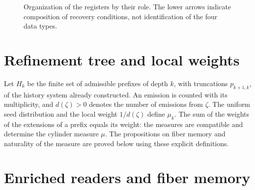 \begin{figure}[htbp]
\centering
{}
\caption{Organization of the registers by their role.
The lower arrows indicate composition of recovery
conditions, not identification of the four data types.}
\label{x_reciprocidad:lib07:fig-registros}
\end{figure}

\section{Refinement tree and local weights}
Let \(H_k\) be the finite set of admissible prefixes of depth
\(k\), with truncations \(p_{k+1,k}\), of the history system already
constructed. An emission is counted with its multiplicity, and
\(d(\zeta)>0\) denotes the number of emissions from \(\zeta\).
The uniform seed distribution and the local weight
\(1/d(\zeta)\) define \(\mu_k\). The sum of the weights of the
extensions of a prefix equals its weight: the measures are
compatible and determine the cylinder measure \(\mu\).
The propositions on fiber memory and
naturality of the measure are proved below using these explicit definitions.

\section{Enriched readers and fiber memory}
\label{x_reciprocidad:sec:ch-memoria-fibra}

